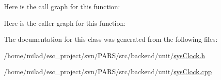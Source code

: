 Here is the call graph for this function:




Here is the caller graph for this function:




The documentation for this class was generated from the following files:\begin{DoxyCompactItemize}
\item 
/home/milad/esc\_\-project/svn/PARS/src/backend/unit/\hyperlink{sysClock_8h}{sysClock.h}\item 
/home/milad/esc\_\-project/svn/PARS/src/backend/unit/\hyperlink{sysClock_8cpp}{sysClock.cpp}\end{DoxyCompactItemize}
